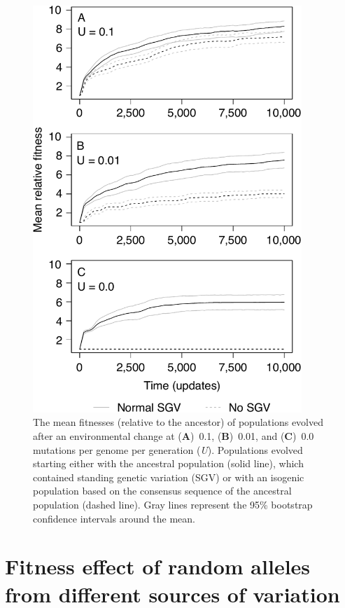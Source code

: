 \begin{doublespace}
\begin{figure}
\begin{center}
\includegraphics[width=4in]{pop-fitness-plot.pdf}
\caption{The mean fitnesses (relative to the ancestor)
  of populations evolved after an environmental change
  at (\textbf{A})~0.1, (\textbf{B})~0.01,
  and (\textbf{C})~0.0 mutations per genome per generation (\emph{U}).
  Populations evolved starting either
  with the ancestral population (solid line),
  which contained standing genetic variation (SGV)
  or with an isogenic population based on
  the consensus sequence of the ancestral population (dashed line).
  Gray lines represent the 95\% bootstrap confidence intervals
  around the mean.}
\label{pop-fitness-plot}
\end{center}
\end{figure}



\section{Fitness effect of random alleles from different sources of variation}


\end{doublespace}

